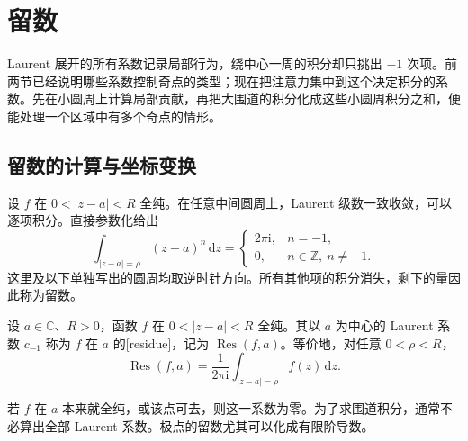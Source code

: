 \section{留数}
\label{b3:sec:0303}

Laurent 展开的所有系数记录局部行为，绕中心一周的积分却只挑出 \(-1\) 次项。前两节已经说明哪些系数控制奇点的类型；现在把注意力集中到这个决定积分的系数。先在小圆周上计算局部贡献，再把大围道的积分化成这些小圆周积分之和，便能处理一个区域中有多个奇点的情形。

\subsection{留数的计算与坐标变换}
\label{b3:subsec:030301}

设 \(f\) 在 \(0<|z-a|<R\) 全纯。在任意中间圆周上，Laurent 级数一致收敛，可以逐项积分。直接参数化给出
\[
 \int_{|z-a|=\rho}(z-a)^n\,\mathrm{d}z
 =
 \begin{cases}
  2\pi\mathrm{i},&n=-1,\\
  0,&n\in\mathbb Z,\ n\ne-1.
 \end{cases}
\]
这里及以下单独写出的圆周均取逆时针方向。所有其他项的积分消失，剩下的量因此称为留数。

\begin{definition}\label{b3:def:03-residue}
设 \(a\in\mathbb C\)、\(R>0\)，函数 \(f\) 在 \(0<|z-a|<R\) 全纯。其以 \(a\) 为中心的 Laurent 系数 \(c_{-1}\) 称为 \(f\) 在 \(a\) 的[residue]，记为 \(\operatorname{Res}(f,a)\)。等价地，对任意 \(0<\rho<R\)，
\[
 \operatorname{Res}(f,a)
 =\frac1{2\pi\mathrm{i}}\int_{|z-a|=\rho}f(z)\,\mathrm{d}z.
\]
\end{definition}
若 \(f\) 在 \(a\) 本来就全纯，或该点可去，则这一系数为零。为了求围道积分，通常不必算出全部 Laurent 系数。极点的留数尤其可以化成有限阶导数。

